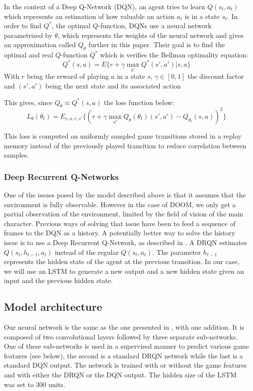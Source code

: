 \documentclass[letterpaper]{article}
\begin{document}
In the context of a Deep Q-Network (DQN), an agent tries to learn
$Q(s_t,a_t)$ which represents an
estimation of how valuable an action $a_t$ is in a state $s_t$. In order to
find $Q^*$, the optimal $Q$-function, DQNs use a neural network
parametrized by $\theta$, which represents the weights of the neural network
and gives an approximation called $Q_\theta$ further in this paper. Their goal
is to find the optimal and real $Q$-function $Q^*$ which is verifies the Bellman
optimality equation:
$$ Q^*(s,a) = E\{r + \gamma \max_{a'}Q^*(s',a')|s,a\} $$
With $r$ being the reward of playing $a$ in a state $s$, $\gamma\in [0,1]$ the
discount factor and $(s',a')$ being the next state and its associated action

This gives, since $Q_{\theta} \approx Q^*(s,a)$ the loss function below:
$$ L_\theta(\theta_t) = E_{s,a,r,s'}\{(r +\gamma \max_{a'}Q_\theta(\theta_t)(s' , a' )-Q_{\theta_t}(s,a))^2\}$$

This loss is computed on uniformly sampled game transitions stored in a
replay memory instead of the previously played transition to reduce correlation
between samples.


\subsubsection{Deep Recurrent Q-Networks}
One of the issues posed by the model described above is that it assumes that the
environment is fully observable. However in the case of DOOM, we only get a
partial
observation of the environment, limited by the field of vision of the main
character. Previous ways of solving that issue have been to feed a sequence of
frames to the DQN as a history.
A potentially better way to solve the history issue is to use a Deep Recurrent
Q-Network, as described in \citep{Hausknecht2015}. A DRQN
estimates $Q(s_t,h_{t-1},a_t)$ instead of the regular $Q(s_t,a_t)$. The
parameter $h_{t-1}$ represents the hidden state of the agent at the previous
transition. In our case, we will use an LSTM to generate a new output and a new
hidden state given an input and the previous hidden state.

\subsection{Model architecture}
Our neural network is the same as the one presented in \citep{Lample2016},
with one addition.
It is composed of two convolutional layers followed by three separate
sub-networks. One of these sub-networks is used in a supervised manner to
predict various game features (see below), the second is a standard
DRQN network while the last is a standard DQN output. The network is trained
with or without the game features and with either the DRQN or the DQN output.
The hidden size of the LSTM was set to 300 units.
\end{document}
